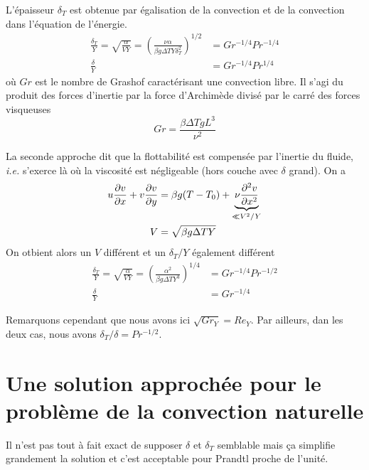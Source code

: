     L'épaisseur $\delta_T$ est obtenue par égalisation de la convection et de la convection dans l'équation de l'énergie.
    \begin{equation}
      \begin{aligned}
        \frac{\delta_T}{Y} = \sqrt{\frac{\alpha}{VY}} = \left(\frac{\nu \alpha}{\beta g \Delta T Y \delta_T^2}\right)^{1/2} &= Gr^{-1/4} Pr^{-1/4}\\
        \frac{\delta}{Y} &= Gr^{-1/4}Pr^{1/4}
      \end{aligned}
    \end{equation}
    où $Gr$ est le nombre de Grashof caractérisant une convection libre. Il s'agi du produit des forces d'inertie par la force d'Archimède divisé par le carré des forces visqueuses
    \begin{equation}
      Gr = \frac{\beta \Delta T g L^3}{\nu^2}
    \end{equation}

    La seconde approche dit que la flottabilité est compensée par l'inertie du fluide, \textit{i.e.} s'exerce là où la viscosité est négligeable (hors couche avec $\delta$ grand). On a
    \begin{equation}
      \begin{aligned}
        u\pdv{v}{x} + v\pdv{v}{y} &= \beta g (T-T_0) + \underbrace{\nu \pdv[2]{v}{x}}_{\ll V^2/Y}\\
        V &= \sqrt{\beta g \Delta T Y}
      \end{aligned}
    \end{equation}
    On otbient alors un $V$ différent et un $\delta_T/Y$ également différent
    \begin{equation}
      \begin{aligned}
        \frac{\delta_T}{Y} = \sqrt{\frac{\alpha}{VY}} = \left(\frac{\alpha^2}{\beta g\Delta T Y^3}\right)^{1/4} &= Gr^{-1/4} Pr^{-1/2}\\
        \frac{\delta}{Y} &= Gr^{-1/4}
      \end{aligned}
    \end{equation}

    Remarquons cependant que nous avons ici $\sqrt{Gr_Y} = Re_Y$. Par ailleurs, dan les deux cas, nous avons $\delta_T/\delta = Pr^{-1/2}$.

  \section{Une solution approchée pour le problème de la convection naturelle}
    Il n'est pas tout à fait exact de supposer $\delta$ et $\delta_T$ semblable mais ça simplifie grandement la solution et c'est acceptable pour Prandtl proche de l'unité.

